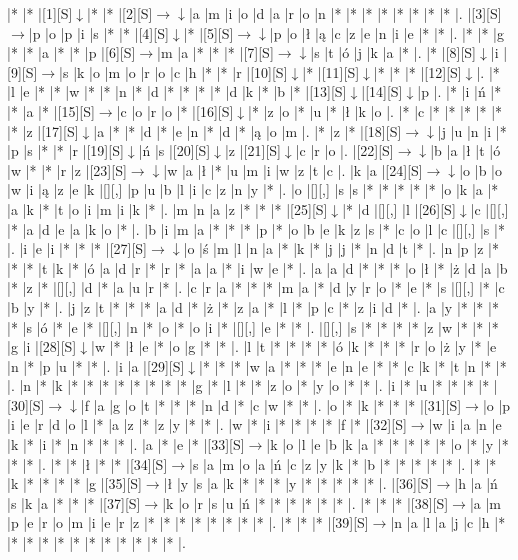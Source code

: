 \documentclass[11pt]{article}
\newcommand\drarr{$\rightarrow \!\!\!\!\! \downarrow$}
\newcommand\rarr{$\rightarrow$}
\newcommand\darr{$\downarrow$}
\begin{document}
\noindent\begin{Puzzle}{22}{31}|*	|*	|[1][S]\darr	|*	|*	|[2][S]\drarr	|a	|m	|i	|o	|d	|a	|r	|o	|n	|*	|*	|*	|*	|*	|*	|*	|*	|.
|[3][S]\rarr	|p	|o	|p	|i	|s	|*	|*	|[4][S]\darr	|*	|[5][S]\drarr	|p	|o	|ł	|ą	|c	|z	|e	|n	|i	|e	|*	|*	|.
|*	|*	|g	|*	|*	|a	|*	|*	|p	|[6][S]\rarr	|m	|a	|*	|*	|*	|[7][S]\drarr	|s	|t	|ó	|j	|k	|a	|*	|.
|*	|[8][S]\darr	|i	|[9][S]\rarr	|s	|k	|o	|m	|o	|r	|o	|c	|h	|*	|*	|r	|[10][S]\darr	|*	|[11][S]\darr	|*	|*	|*	|[12][S]\darr	|.
|*	|l	|e	|*	|*	|w	|*	|*	|n	|*	|d	|*	|*	|*	|*	|d	|k	|*	|b	|*	|[13][S]\darr	|[14][S]\darr	|p	|.
|*	|i	|ń	|*	|*	|a	|*	|[15][S]\rarr	|c	|o	|r	|o	|*	|[16][S]\darr	|*	|z	|o	|*	|u	|*	|ł	|k	|o	|.
|*	|c	|*	|*	|*	|*	|*	|*	|z	|[17][S]\darr	|a	|*	|*	|d	|*	|e	|n	|*	|d	|*	|ą	|o	|m	|.
|*	|z	|*	|[18][S]\drarr	|j	|u	|n	|i	|*	|p	|s	|*	|*	|r	|[19][S]\darr	|ń	|s	|[20][S]\darr	|z	|[21][S]\darr	|c	|r	|o	|.
|[22][S]\drarr	|b	|a	|ł	|t	|ó	|w	|*	|*	|r	|z	|[23][S]\drarr	|w	|a	|ł	|*	|u	|m	|i	|w	|z	|t	|c	|.
|k	|a	|[24][S]\drarr	|o	|b	|o	|w	|i	|ą	|z	|e	|k	|[][,]{ }	|p	|u	|b	|l	|i	|c	|z	|n	|y	|*	|.
|o	|[][,]{ }	|s	|s	|*	|*	|*	|*	|*	|o	|k	|a	|*	|a	|k	|*	|t	|o	|i	|m	|i	|k	|*	|.
|m	|n	|a	|z	|*	|*	|*	|[25][S]\darr	|*	|d	|[][,]{ }	|l	|[26][S]\darr	|c	|[][,]{ }	|*	|a	|d	|e	|a	|k	|o	|*	|.
|b	|i	|m	|a	|*	|*	|*	|p	|*	|o	|b	|e	|k	|z	|s	|*	|c	|o	|l	|c	|[][,]{ }	|s	|*	|.
|i	|e	|i	|*	|*	|*	|[27][S]\drarr	|o	|ś	|m	|l	|n	|a	|*	|k	|*	|j	|j	|*	|n	|d	|t	|*	|.
|n	|p	|z	|*	|*	|*	|t	|k	|*	|ó	|a	|d	|r	|*	|r	|*	|a	|a	|*	|i	|w	|e	|*	|.
|a	|a	|d	|*	|*	|*	|o	|ł	|*	|ż	|d	|a	|b	|*	|z	|*	|[][,]{ }	|d	|*	|a	|u	|r	|*	|.
|c	|r	|a	|*	|*	|*	|m	|a	|*	|d	|y	|r	|o	|*	|e	|*	|s	|[][,]{ }	|*	|c	|b	|y	|*	|.
|j	|z	|t	|*	|*	|*	|a	|d	|*	|ż	|*	|z	|a	|*	|l	|*	|p	|c	|*	|z	|i	|d	|*	|.
|a	|y	|*	|*	|*	|*	|s	|ó	|*	|e	|*	|[][,]{ }	|n	|*	|o	|*	|o	|i	|*	|[][,]{ }	|e	|*	|*	|.
|[][,]{ }	|s	|*	|*	|*	|*	|z	|w	|*	|*	|*	|g	|i	|[28][S]\darr	|w	|*	|ł	|e	|*	|o	|g	|*	|*	|.
|l	|t	|*	|*	|*	|*	|ó	|k	|*	|*	|*	|r	|o	|ż	|y	|*	|e	|n	|*	|p	|u	|*	|*	|.
|i	|a	|[29][S]\darr	|*	|*	|*	|w	|a	|*	|*	|*	|e	|n	|e	|*	|*	|c	|k	|*	|t	|n	|*	|*	|.
|n	|*	|k	|*	|*	|*	|*	|*	|*	|*	|*	|g	|*	|l	|*	|*	|z	|o	|*	|y	|o	|*	|*	|.
|i	|*	|u	|*	|*	|*	|*	|[30][S]\drarr	|f	|a	|g	|o	|t	|*	|*	|*	|n	|d	|*	|c	|w	|*	|*	|.
|o	|*	|k	|*	|*	|*	|[31][S]\rarr	|o	|p	|i	|e	|r	|d	|o	|l	|*	|a	|z	|*	|z	|y	|*	|*	|.
|w	|*	|i	|*	|*	|*	|*	|f	|*	|[32][S]\rarr	|w	|i	|a	|n	|e	|k	|*	|i	|*	|n	|*	|*	|*	|.
|a	|*	|e	|*	|[33][S]\rarr	|k	|o	|l	|e	|b	|k	|a	|*	|*	|*	|*	|*	|o	|*	|y	|*	|*	|*	|.
|*	|*	|ł	|*	|*	|[34][S]\rarr	|s	|a	|m	|o	|a	|ń	|c	|z	|y	|k	|*	|b	|*	|*	|*	|*	|*	|.
|*	|*	|k	|*	|*	|*	|*	|g	|[35][S]\rarr	|ł	|y	|s	|a	|k	|*	|*	|*	|y	|*	|*	|*	|*	|*	|.
|[36][S]\rarr	|h	|a	|ń	|s	|k	|a	|*	|*	|*	|[37][S]\rarr	|k	|o	|r	|s	|u	|ń	|*	|*	|*	|*	|*	|*	|.
|*	|*	|*	|[38][S]\rarr	|a	|m	|p	|e	|r	|o	|m	|i	|e	|r	|z	|*	|*	|*	|*	|*	|*	|*	|*	|.
|*	|*	|*	|[39][S]\rarr	|n	|a	|l	|a	|j	|c	|h	|*	|*	|*	|*	|*	|*	|*	|*	|*	|*	|*	|*	|.\end{Puzzle}
\end{document}
